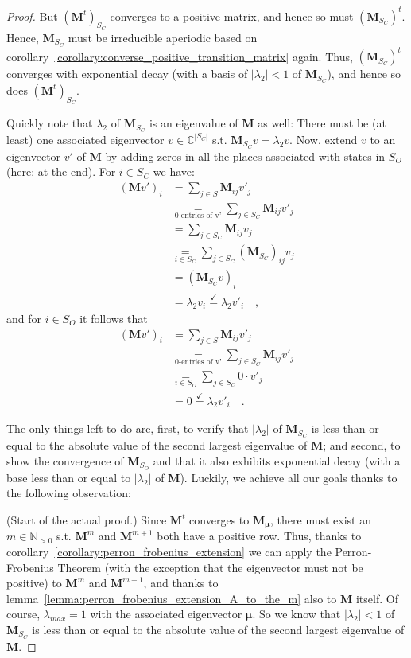 \documentclass[../../main.tex]{subfiles}
\begin{document}
\begin{proof}
        But $(\bm{M}^t)_{S_C}$ converges to a positive matrix, and hence so must $(\bm{M}_{S_C})^t$. Hence, $\bm{M}_{S_C}$ must be irreducible aperiodic based on corollary~\ref{corollary:converse_positive_transition_matrix} again. Thus, $(\bm{M}_{S_C})^t$ converges with exponential decay (with a basis of $|\lambda_2| < 1$ of $\bm{M}_{S_C}$), and hence so does $(\bm{M}^t)_{S_C}$.

        Quickly note that $\lambda_2$ of $\bm{M}_{S_C}$ is an eigenvalue of $\bm{M}$ as well: There must be (at least) one associated eigenvector $v \in \mathbb{C}^{|S_C|}$ s.t. $\bm{M}_{S_C} v = \lambda_2 v$. Now, extend $v$ to an eigenvector $v'$ of $\bm{M}$ by adding zeros in all the places associated with states in $S_O$ (here: at the end). For $i \in S_C$ we have:
        \begin{align*}
            (\bm{M} v')_i &= \sum_{j \in S} \bm{M}_{ij} v'_j \\
            &\underset{\text{0-entries of v'}}{=} \sum_{j \in S_C} \bm{M}_{ij} v'_j \\
            &= \sum_{j \in S_C} \bm{M}_{ij} v_j \\
            &\underset{i \in S_C}{=} \sum_{j \in S_C} (\bm{M}_{S_C})_{ij} v_j \\
            &= (\bm{M}_{S_C} v)_i \\
            &= \lambda_2 v_i \overset{\checkmark}{=} \lambda_2 v'_i \quad ,
        \end{align*}
        and for $i \in S_O$ it follows that
        \begin{align*}
            (\bm{M} v')_i &= \sum_{j \in S} \bm{M}_{ij} v'_j \\
            &\underset{\text{0-entries of v'}}{=} \sum_{j \in S_C} \bm{M}_{ij} v'_j \\
            &\underset{i \in S_O}{=} \sum_{j \in S_C} 0 \cdot v'_j \\
            &= 0 \overset{\checkmark}{=} \lambda_2 v'_i \quad .
        \end{align*}

        The only things left to do are, first, to verify that $|\lambda_2|$ of $\bm{M}_{S_C}$ is less than or equal to the absolute value of the second largest eigenvalue of $\bm{M}$; and second, to show the convergence of $\bm{M}_{S_O}$ and that it also exhibits exponential decay (with a base less than or equal to $|\lambda_2|$ of $\bm{M}$). Luckily, we achieve all our goals thanks to the following observation:

        (Start of the actual proof.) Since $\bm{M}^t$ converges to $\bm{M_\mu}$, there must exist an $m \in \mathbb{N}_{>0}$ s.t. $\bm{M}^m$ and $\bm{M}^{m + 1}$ both have a positive row. Thus, thanks to corollary~\ref{corollary:perron_frobenius_extension} we can apply the Perron-Frobenius Theorem (with the exception that the eigenvector must not be positive) to $\bm{M}^m$ and $\bm{M}^{m + 1}$, and thanks to lemma~\ref{lemma:perron_frobenius_extension_A_to_the_m} also to $\bm{M}$ itself. Of course, $\lambda_{max} = 1$ with the associated eigenvector $\bm{\mu}$. So we know that $|\lambda_2| < 1$ of $\bm{M}_{S_C}$ is less than or equal to the absolute value of the second largest eigenvalue of $\bm{M}$.


\end{proof}
\end{document}
